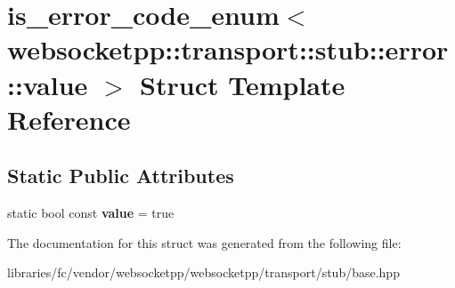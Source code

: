 \hypertarget{structis__error__code__enum_3_01websocketpp_1_1transport_1_1stub_1_1error_1_1value_01_4}{}\section{is\+\_\+error\+\_\+code\+\_\+enum$<$ websocketpp\+:\+:transport\+:\+:stub\+:\+:error\+:\+:value $>$ Struct Template Reference}
\label{structis__error__code__enum_3_01websocketpp_1_1transport_1_1stub_1_1error_1_1value_01_4}
\subsection*{Static Public Attributes}
\begin{DoxyCompactItemize}
\item 
\mbox{\label{structis__error__code__enum_3_01websocketpp_1_1transport_1_1stub_1_1error_1_1value_01_4_a48ac59af9c03585ba1f1f7b8e83a45ee}} 
static bool const {\bfseries value} = true
\end{DoxyCompactItemize}


The documentation for this struct was generated from the following file\+:\begin{DoxyCompactItemize}
\item 
libraries/fc/vendor/websocketpp/websocketpp/transport/stub/base.\+hpp\end{DoxyCompactItemize}
